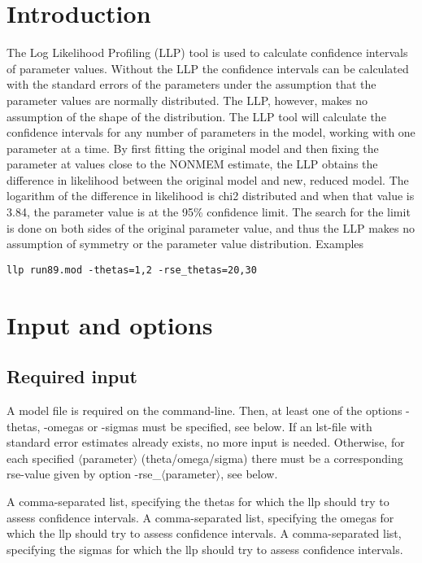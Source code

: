 


\maketitle


\section{Introduction}
The Log Likelihood Profiling (LLP) tool is used to calculate confidence intervals of parameter values. Without the LLP the confidence intervals can be calculated with the standard errors of the parameters under the assumption that the parameter values are normally distributed. The LLP, however, makes no assumption of the shape of the distribution.
The LLP tool will calculate the confidence intervals for any number of parameters in the model, working with one parameter at a time. By first fitting the original model and then fixing the parameter at values close to the NONMEM estimate, the LLP obtains the difference in likelihood between the original model and new, reduced model. The logarithm of the difference in likelihood is chi2 distributed and when that value is 3.84, the parameter value is at the 95\% confidence limit. The search for the limit is done on both sides of the original parameter value, and thus the LLP makes no assumption of symmetry or the parameter value distribution.
Examples
\begin{verbatim}
llp run89.mod -thetas=1,2 -rse_thetas=20,30
\end{verbatim}

\section{Input and options}

\subsection{Required input}
A model file is required on the command-line. Then, at least one of the options -thetas, -omegas or -sigmas must be specified, see below. If an lst-file with standard error estimates already exists, no more input is needed. Otherwise, for each specified $\langle$parameter$\rangle$ (theta/omega/sigma) there must be a corresponding rse-value given by option -rse\_$\langle$parameter$\rangle$, see below. 

\begin{optionlist}
A comma-separated list, specifying the thetas for which the llp should try to assess confidence intervals. 
\nextopt
{}
A comma-separated list, specifying the omegas for which the llp should try to assess confidence intervals. 
\nextopt
{}
A comma-separated list, specifying the sigmas for which the llp should try to assess confidence intervals. 
\nextopt
\end{optionlist}

